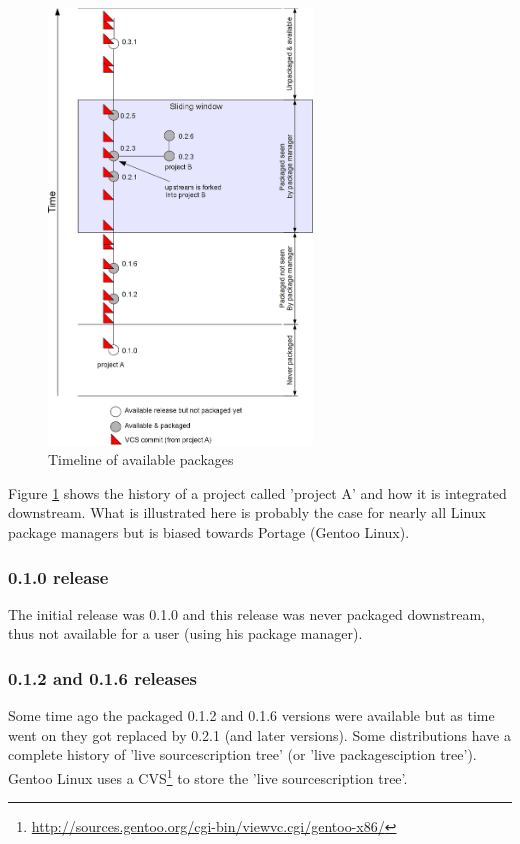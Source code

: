 \documentclass[a4paper,10pt]{article}
\begin{document}
\begin{figure}
  \begin{center}
    \includegraphics[width=70mm]{diagrams/timeline.png}
  \end{center}
  \caption{Timeline of available packages}
\label{fig:timeline}
\end{figure}

Figure \ref{fig:timeline} shows the history of a project called 'project A' and how it is integrated downstream. What is illustrated here is probably the case for nearly all Linux package managers but is biased towards Portage (Gentoo Linux).
\subsubsection*{0.1.0 release}
The initial release was 0.1.0 and this release was never packaged downstream, thus not available for a user (using his package manager).

\subsubsection*{0.1.2 and 0.1.6 releases}
Some time ago the packaged 0.1.2 and 0.1.6 versions were available but as time went on they got replaced by 0.2.1 (and later versions). Some distributions have a complete history of 'live sourcescription tree' (or 'live packagesciption tree'). Gentoo Linux uses a CVS\footnote{\url{http://sources.gentoo.org/cgi-bin/viewvc.cgi/gentoo-x86/}} to store the 'live sourcescription tree'.
\end{document}
